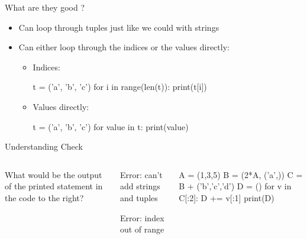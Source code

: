 \documentclass[pdf, aspectratio=169, 12pt]{beamer}
\begin{document}
\begin{frame}[fragile]{What are they good ?}
	\begin{itemize}
		\item Can loop through tuples just like we could with strings
		\item Can either loop through the indices or the values directly:
			\begin{itemize}
				\item Indices:
					\begin{pythoncode}
						t = ('a', 'b', 'c')
						for i in range(len(t)):
							print(t[i])
					\end{pythoncode}
				\item Values directly:
					\begin{pythoncode}
						t = ('a', 'b', 'c')
						for value in t:
							print(value)
					\end{pythoncode}
			\end{itemize}
	\end{itemize}
\end{frame}

\begin{frame}[fragile]{Understanding Check}
	\begin{columns}
		What would be the output of the printed statement in the code to the right?
		\begin{poll}
		\item {}
		\item {}
		\item Error: can't add strings and tuples
		\item Error: index out of range
		\end{poll}
		\begin{pythoncode}
			A = (1,3,5)
			B = (2*A, ('a',))
			C = B + ('b','c','d')
			D = ()
			for v in C[:2]:
				D += v[:1]
			print(D)
		\end{pythoncode}
	\end{columns}
\end{frame}
\end{document}
